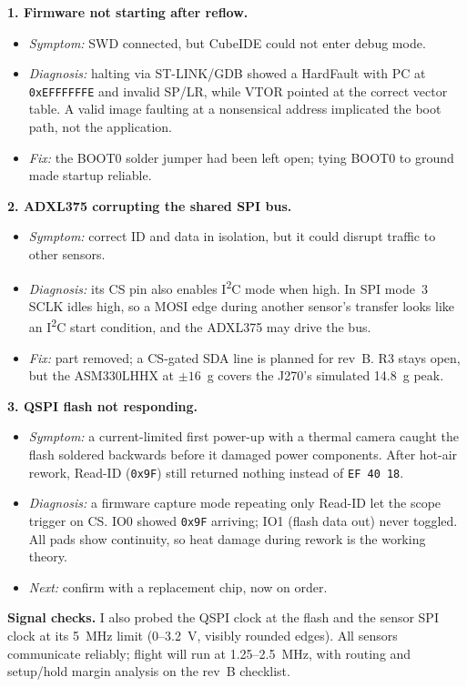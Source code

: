 \documentclass[10pt,letterpaper]{article}
\begin{document}
\textbf{1. Firmware not starting after reflow.}
\begin{itemize}
\item \emph{Symptom:} SWD connected, but CubeIDE could not enter debug mode.
\item \emph{Diagnosis:} halting via ST-LINK/GDB showed a HardFault with PC at \texttt{0xEFFFFFFE}
  and invalid SP/LR, while VTOR pointed at the correct vector table. A valid image faulting at a
  nonsensical address implicated the boot path, not the application.
\item \emph{Fix:} the BOOT0 solder jumper had been left open; tying BOOT0 to ground made startup reliable.
\end{itemize}

\textbf{2. ADXL375 corrupting the shared SPI bus.}
\begin{itemize}
\item \emph{Symptom:} correct ID and data in isolation, but it could disrupt traffic to other sensors.
\item \emph{Diagnosis:} its CS pin also enables I\textsuperscript{2}C mode when high. In SPI mode~3
  SCLK idles high, so a MOSI edge during another sensor's transfer looks like an
  I\textsuperscript{2}C start condition, and the ADXL375 may drive the bus.
\item \emph{Fix:} part removed; a CS-gated SDA line is planned for rev~B. R3 stays open, but the
  ASM330LHHX at $\pm16$~g covers the J270's simulated 14.8~g peak.
\end{itemize}

\textbf{3. QSPI flash not responding.}
\begin{itemize}
\item \emph{Symptom:} a current-limited first power-up with a thermal camera caught the flash soldered
  backwards before it damaged power components. After hot-air rework, Read-ID (\texttt{0x9F}) still
  returned nothing instead of \texttt{EF 40 18}.
\item \emph{Diagnosis:} a firmware capture mode repeating only Read-ID let the scope trigger on CS.
  IO0 showed \texttt{0x9F} arriving; IO1 (flash data out) never toggled. All pads show continuity,
  so heat damage during rework is the working theory.
\item \emph{Next:} confirm with a replacement chip, now on order.
\end{itemize}

\textbf{Signal checks.} I also probed the QSPI clock at the flash and the sensor SPI clock at its
5~MHz limit (0--3.2~V, visibly rounded edges). All sensors communicate reliably; flight will run
at 1.25--2.5~MHz, with routing and setup/hold margin analysis on the rev~B checklist.
\end{document}
